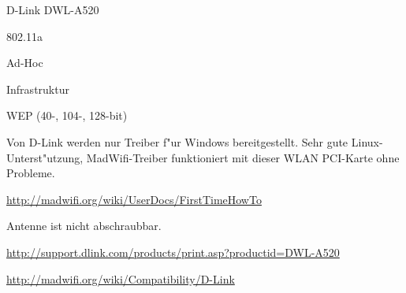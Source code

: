 %
%
\begin{wlandevice}{D-Link DWL-A520}



\begin{wlanieeestandard}
\item 802.11a
\end{wlanieeestandard}

\begin{wlanmode}
\item Ad-Hoc
\item Infrastruktur
\end{wlanmode}

\begin{wlansecurity}
\item WEP (40-, 104-, 128-bit)
\end{wlansecurity}

\begin{wlandriver}
\item
Von D-Link werden nur Treiber f"ur Windows bereitgestellt.
Sehr gute Linux-Unterst"utzung, MadWifi-Treiber funktioniert
mit dieser WLAN PCI-Karte ohne Probleme.
\end{wlandriver}


\begin{wlaninstall}
\item
\url{http://madwifi.org/wiki/UserDocs/FirstTimeHowTo}
\end{wlaninstall}

\begin{wlanextrainfo}
\item
Antenne ist nicht abschraubbar.
\end{wlanextrainfo}

\begin{wlanlink}
\item \url{http://support.dlink.com/products/print.asp?productid=DWL-A520}
\item \url{http://madwifi.org/wiki/Compatibility/D-Link}
\end{wlanlink}

\end{wlandevice}

